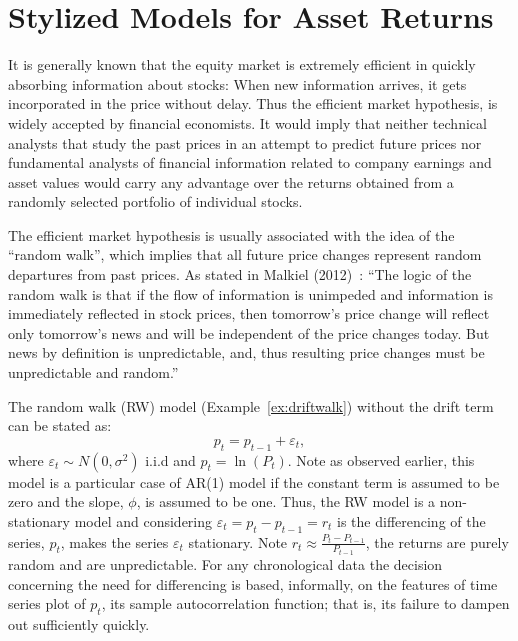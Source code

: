 \section{Stylized Models for Asset Returns} \label{in:assetret1} \label{in:style1}

It is generally known that the equity market is extremely efficient in quickly absorbing information about stocks: When new information arrives, it gets incorporated in the price without delay. Thus the efficient market hypothesis, is widely accepted by financial economists. It would imply that neither technical analysts that study the past prices in an attempt to predict future prices nor fundamental analysts of financial information related to company earnings and asset values would carry any advantage over the returns obtained from a randomly selected portfolio of individual stocks.


The efficient market hypothesis is usually associated with the idea of the ``random walk'',\label{in:random2} which implies that all future price changes represent random departures from past prices. As stated in Malkiel (2012)~\cite{malkiel}: ``The logic of the random walk is that if the flow of information is unimpeded and information is immediately reflected in stock prices, then tomorrow's price change will reflect only tomorrow's news and will be independent of the price changes today. But news by definition is unpredictable, and, thus resulting price changes must be unpredictable and random.''


The random walk (RW) model (Example~\ref{ex:driftwalk}) without the drift term can be stated as:
	\begin{equation} \label{eqn:2pteq}
	p_t = p_{t-1} + \varepsilon_t,
	\end{equation}
where $\varepsilon_t \sim N(0,\sigma^2)$ i.i.d and $p_t = \ln{(P_t)}$. Note as observed earlier, this model is a particular case of AR(1) model if the constant term is assumed to be zero and the slope, $\phi$, is assumed to be one. Thus, the RW model is a non-stationary model and considering $\varepsilon_t = p_t - p_{t-1}=r_t$ is the differencing of the series, $p_t$, makes the series $\varepsilon_t$ stationary. Note $r_t \approx \frac{P_t - P_{t-1}}{P_{t-1}}$,  the returns are purely random and are unpredictable. For any chronological data the decision concerning the need for differencing is based, informally, on the features of time series plot of $p_t$, its sample autocorrelation function; that is, its failure to dampen out sufficiently quickly. \twomedskip



